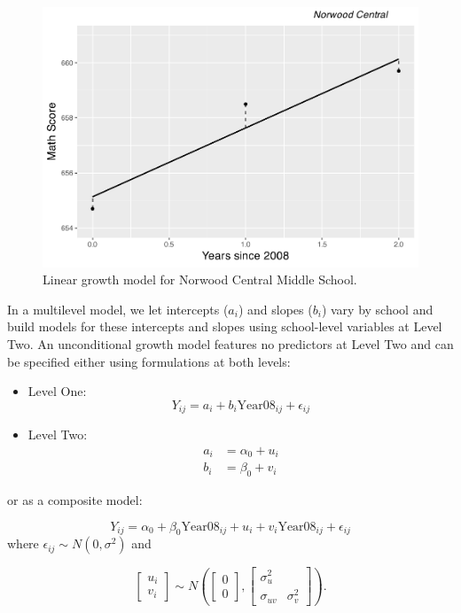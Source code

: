 \documentclass[
]{krantz}
\begin{document}
\begin{figure}

{\centering \includegraphics[width=0.6\linewidth]{bookdown-BeyondMLR_files/figure-latex/lon-scat3-1} 

}

\caption{Linear growth model for Norwood Central Middle School.}\label{fig:lon-scat3}
\end{figure}

In a multilevel model, we let intercepts (\(a_{i}\)) and slopes (\(b_{i}\)) vary by school and build models for these intercepts and slopes using school-level variables at Level Two. An unconditional growth model features no predictors at Level Two and can be specified either using formulations at both levels:

\begin{itemize}
\item
  Level One:
  \begin{equation*}
  Y_{ij}=a_{i}+b_{i}\textrm{Year08}_{ij} + \epsilon_{ij}
  \end{equation*}
\item
  Level Two:
  \begin{align*}
  a_{i}&=\alpha_{0} + u_{i}\\
  b_{i}&=\beta_{0} + v_{i}
  \end{align*}
\end{itemize}

or as a composite model:

\begin{equation*}
Y_{ij}=\alpha_{0} + \beta_{0}\textrm{Year08}_{ij}+u_{i}+v_{i}\textrm{Year08}_{ij} + \epsilon_{ij}
\end{equation*}
where \(\epsilon_{ij}\sim N(0,\sigma^2)\) and

\[ \left[ \begin{array}{c}
            u_{i} \\ v_{i}
          \end{array}  \right] \sim N \left( \left[
          \begin{array}{c}
            0 \\ 0
          \end{array} \right], \left[
          \begin{array}{cc}
            \sigma_{u}^{2} & \\
            \sigma_{uv} & \sigma_{v}^{2}
          \end{array} \right] \right) . \]
\end{document}
